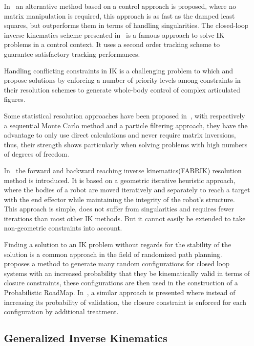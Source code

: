 In~\cite{pechev2008inverse} an alternative method based on a control approach is proposed, where no matrix manipulation is required, this approach is as fast as the damped least squares, but outperforms them in terms of handling singularities.
The closed-loop inverse kinematics scheme presented in~\cite{siciliano1990closed} is a famous approach to solve IK problems in a control context.
It uses a second order tracking scheme to guarantee satisfactory tracking performances.

Handling conflicting constraints in IK is a challenging problem to which \cite{baerlocher2004inverse} and \cite{sentis2005synthesis} propose solutions by enforcing a number of priority levels among constraints in their resolution schemes to generate whole-body control of complex articulated figures.

Some statistical resolution approaches have been proposed in~\cite{courty2008inverse, hecker2008real}, with respectively a sequential Monte Carlo method and a particle filtering approach, they have the advantage to only use direct calculations and never require matrix inversions, thus, their strength shows particularly when solving problems with high numbers of degrees of freedom.

In~\cite{AristidouFABRIK, Aristidou:2016_ExtFABRIK} the forward and backward reaching inverse kinematics(FABRIK) resolution method is introduced.
It is based on a geometric iterative heuristic approach, where the bodies of a robot are moved iteratively and separately to reach a target with the end effector while maintaining the integrity of the robot's structure.
This approach is simple, does not suffer from singularities and requires fewer iterations than most other IK methods.
But it cannot easily be extended to take non-geometric constraints into account.

Finding a solution to an IK problem without regards for the stability of the solution is a common approach in the field of randomized path planning.
\cite{cortes2002random} proposes a method to generate many random configurations for closed loop systems with an increased probability that they be kinematically valid in terms of closure constraints, these configurations are then used in the construction of a Probabilistic RoadMap. In~\cite{lavalle1999probabilistic}, a similar approach is presented where instead of increasing its probability of validation, the closure constraint is enforced for each configuration by additional treatment.

\subsection{Generalized Inverse Kinematics}
\label{sub:generalized_inverse_kinematics}

